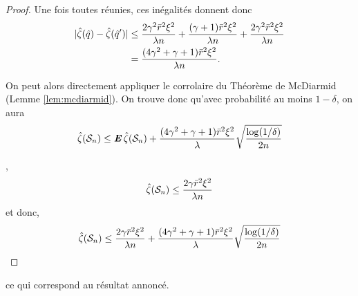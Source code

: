\begin{proof}
  Une fois toutes réunies, ces inégalités donnent donc
  \begin{align}
    |\hat\zeta(\hat q) - \hat\zeta(\hat q')| &\leq \frac{2\gamma^2\bar r^2\xi^2}{\lambda n} + \frac{(\gamma+1)\bar r^2\xi^2}{\lambda n}
                                 + \frac{2\gamma^2\bar r^2\xi^2}{\lambda n}\\
                               & = \frac{(4\gamma^2 + \gamma + 1)\bar r^2\xi^2}{\lambda n}.
  \end{align}

  On peut alors directement appliquer le corrolaire du Théorème de McDiarmid (Lemme
  \ref{lem:mcdiarmid}). On trouve donc qu'avec probabilité au moins $1-\delta$, on aura
  \begin{equation}
    \hat\zeta(\mathcal S_n) \leq \operatorname{\mbox{\textbf{\textit{E}}}}\hat\zeta(\mathcal S_n) + \frac{(4\gamma^2 + \gamma +
      1)\bar r^2\xi^2}{\lambda}\sqrt{\frac{\log(1/\delta)}{2n}} 
  \end{equation}

  ,
  \begin{equation}
    \hat\zeta(\mathcal S_n) \leq \frac{2\gamma\bar r^2\xi^2}{\lambda n}
  \end{equation}
  et donc,
  \begin{equation}
    \hat\zeta(\mathcal S_n) \leq \frac{2\gamma\bar r^2\xi^2}{\lambda n} + \frac{(4\gamma^2 + \gamma +
        1)\bar r^2\xi^2}{\lambda}\sqrt{\frac{\log(1/\delta)}{2n}}
  \end{equation}
\end{proof}
ce qui correspond au résultat annoncé.


\clearpage
\newpage













